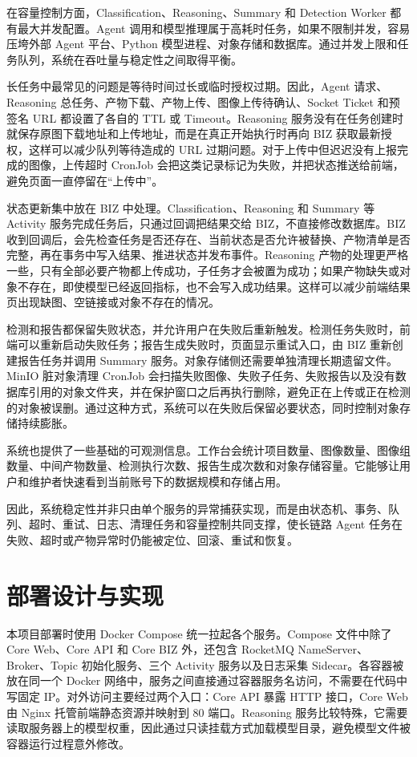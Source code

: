 在容量控制方面，Classification、Reasoning、Summary 和 Detection Worker 都有最大并发配置。Agent 调用和模型推理属于高耗时任务，如果不限制并发，容易压垮外部 Agent 平台、Python 模型进程、对象存储和数据库。通过并发上限和任务队列，系统在吞吐量与稳定性之间取得平衡。

长任务中最常见的问题是等待时间过长或临时授权过期。因此，Agent 请求、Reasoning 总任务、产物下载、产物上传、图像上传待确认、Socket Ticket 和预签名 URL 都设置了各自的 TTL 或 Timeout。Reasoning 服务没有在任务创建时就保存原图下载地址和上传地址，而是在真正开始执行时再向 BIZ 获取最新授权，这样可以减少队列等待造成的 URL 过期问题。对于上传中但迟迟没有上报完成的图像，上传超时 CronJob 会把这类记录标记为失败，并把状态推送给前端，避免页面一直停留在“上传中”。

状态更新集中放在 BIZ 中处理。Classification、Reasoning 和 Summary 等 Activity 服务完成任务后，只通过回调把结果交给 BIZ，不直接修改数据库。BIZ 收到回调后，会先检查任务是否还存在、当前状态是否允许被替换、产物清单是否完整，再在事务中写入结果、推进状态并发布事件。Reasoning 产物的处理更严格一些，只有全部必要产物都上传成功，子任务才会被置为成功；如果产物缺失或对象不存在，即使模型已经返回指标，也不会写入成功结果。这样可以减少前端结果页出现缺图、空链接或对象不存在的情况。

检测和报告都保留失败状态，并允许用户在失败后重新触发。检测任务失败时，前端可以重新启动失败任务；报告生成失败时，页面显示重试入口，由 BIZ 重新创建报告任务并调用 Summary 服务。对象存储侧还需要单独清理长期遗留文件。MinIO 脏对象清理 CronJob 会扫描失败图像、失败子任务、失败报告以及没有数据库引用的对象文件夹，并在保护窗口之后再执行删除，避免正在上传或正在检测的对象被误删。通过这种方式，系统可以在失败后保留必要状态，同时控制对象存储持续膨胀。

系统也提供了一些基础的可观测信息。工作台会统计项目数量、图像数量、图像组数量、中间产物数量、检测执行次数、报告生成次数和对象存储容量。它能够让用户和维护者快速看到当前账号下的数据规模和存储占用。

因此，系统稳定性并非只由单个服务的异常捕获实现，而是由状态机、事务、队列、超时、重试、日志、清理任务和容量控制共同支撑，使长链路 Agent 任务在失败、超时或产物异常时仍能被定位、回滚、重试和恢复。

\section{部署设计与实现}
\label{sec:implementation-deployment-implementation}

本项目部署时使用 Docker Compose 统一拉起各个服务。Compose 文件中除了 Core Web、Core API 和 Core BIZ 外，还包含 RocketMQ NameServer、Broker、Topic 初始化服务、三个 Activity 服务以及日志采集 Sidecar。各容器被放在同一个 Docker 网络中，服务之间直接通过容器服务名访问，不需要在代码中写固定 IP。对外访问主要经过两个入口：Core API 暴露 HTTP 接口，Core Web 由 Nginx 托管前端静态资源并映射到 80 端口。Reasoning 服务比较特殊，它需要读取服务器上的模型权重，因此通过只读挂载方式加载模型目录，避免模型文件被容器运行过程意外修改。

